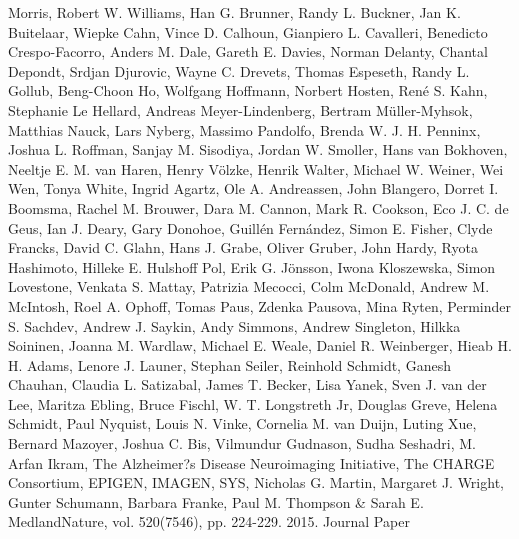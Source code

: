 \documentclass[twocolumn]{bmcart}%
\begin{document}
\begin{backmatter}
Morris, Robert W. Williams, Han G. Brunner, Randy L. Buckner, Jan K. Buitelaar, Wiepke Cahn, Vince D. Calhoun, Gianpiero L. Cavalleri, Benedicto Crespo-Facorro, Anders M. Dale, Gareth E. Davies, Norman Delanty, Chantal Depondt, Srdjan Djurovic, Wayne C. Drevets, Thomas Espeseth, Randy L. Gollub, Beng-Choon Ho, Wolfgang Hoffmann, Norbert Hosten, René S. Kahn, Stephanie Le Hellard, Andreas Meyer-Lindenberg, Bertram Müller-Myhsok, Matthias Nauck, Lars Nyberg, Massimo Pandolfo, Brenda W. J. H. Penninx, Joshua L. Roffman, Sanjay M. Sisodiya, Jordan W. Smoller, Hans van Bokhoven, Neeltje E. M. van Haren, Henry Völzke, Henrik Walter, Michael W. Weiner, Wei Wen, Tonya White, Ingrid Agartz, Ole A. Andreassen, John Blangero, Dorret I. Boomsma, Rachel M. Brouwer, Dara M. Cannon, Mark R. Cookson, Eco J. C. de Geus, Ian J. Deary, Gary Donohoe, Guillén Fernández, Simon E. Fisher, Clyde Francks, David C. Glahn, Hans J. Grabe, Oliver Gruber, John Hardy, Ryota Hashimoto, Hilleke E. Hulshoff Pol, Erik G. Jönsson, Iwona Kloszewska, Simon Lovestone, Venkata S. Mattay, Patrizia Mecocci, Colm McDonald, Andrew M. McIntosh, Roel A. Ophoff, Tomas Paus, Zdenka Pausova, Mina Ryten, Perminder S. Sachdev, Andrew J. Saykin, Andy Simmons, Andrew Singleton, Hilkka Soininen, Joanna M. Wardlaw, Michael E. Weale, Daniel R. Weinberger, Hieab H. H. Adams, Lenore J. Launer, Stephan Seiler, Reinhold Schmidt, Ganesh Chauhan, Claudia L. Satizabal, James T. Becker, Lisa Yanek, Sven J. van der Lee, Maritza Ebling, Bruce Fischl, W. T. Longstreth Jr, Douglas Greve, Helena Schmidt, Paul Nyquist, Louis N. Vinke, Cornelia M. van Duijn, Luting Xue, Bernard Mazoyer, Joshua C. Bis, Vilmundur Gudnason, Sudha Seshadri, M. Arfan Ikram, The Alzheimer?s Disease Neuroimaging Initiative, The CHARGE Consortium, EPIGEN, IMAGEN, SYS, Nicholas G. Martin, Margaret J. Wright, Gunter Schumann, Barbara Franke, Paul M. Thompson & Sarah E. MedlandNature, vol. 520(7546), pp. 224-229. 2015. Journal Paper


\end{backmatter}
\end{document}
